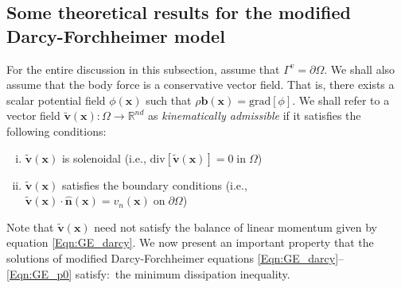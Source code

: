 \documentclass[11pt,reqno]{amsart}
\begin{document}
\subsection{Some theoretical results for the modified 
  Darcy-Forchheimer model}
For the entire discussion in this subsection, assume that 
$\Gamma^{v} = \partial \Omega$. We shall also assume that 
the body force is a conservative vector field. That is, 
there exists a scalar potential field $\phi(\mathbf{x})$ 
such that $\rho \mathbf{b}(\mathbf{x}) = \mathrm{grad}
[\phi]$. 
We shall refer to a vector field $\widetilde{\mathbf{v}}
(\mathbf{x}):\Omega \rightarrow \mathbb{R}^{nd}$ as 
\emph{kinematically admissible} if it satisfies the 
following conditions: 
\begin{enumerate}[(i)]
\item $\widetilde{\mathbf{v}}(\mathbf{x})$ is solenoidal  
  (i.e., $\mathrm{div}[\widetilde{\mathbf{v}}(\mathbf{x})] 
  = 0 \; \mathrm{in} \; \Omega$)
\item $\widetilde{\mathbf{v}}(\mathbf{x})$ satisfies 
  the boundary conditions (i.e., $\widetilde{\mathbf{v}}
  (\mathbf{x}) \cdot \hat{\mathbf{n}}(\mathbf{x}) = v_n
  (\mathbf{x}) \; \mathrm{on} \; \partial \Omega$)
\end{enumerate}
Note that $\widetilde{\mathbf{v}}(\mathbf{x})$ 
need not satisfy the balance of linear momentum 
given by equation \eqref{Eqn:GE_darcy}. We now 
present an important property that the solutions 
of modified Darcy-Forchheimer equations 
\eqref{Eqn:GE_darcy}--\eqref{Eqn:GE_p0} 
satisfy:~the minimum dissipation inequality. 
\end{document}
